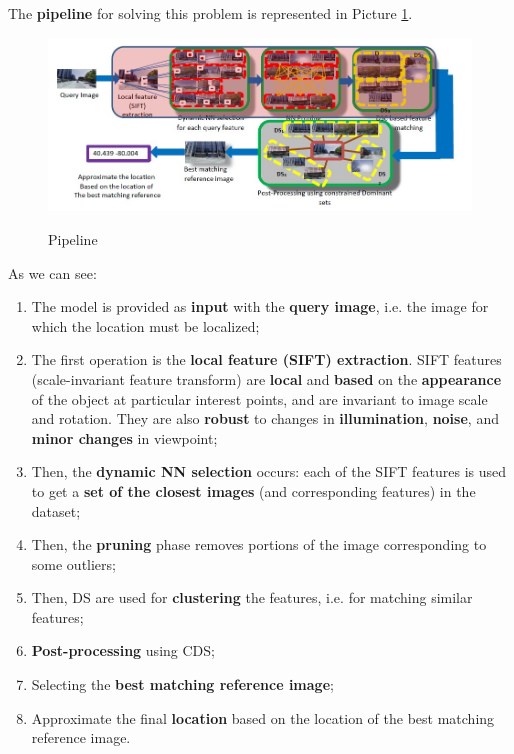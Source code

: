 The \textbf{pipeline} for solving this problem is represented in Picture \ref{geo3}.

\begin{figure}[h!]
    \centering
    \includegraphics[scale = 1.5]{img/geo3.jpg}
    \label{geo3}
    \caption{Pipeline}
\end{figure}

As we can see:

\begin{enumerate}
    \item The model is provided as \textbf{input} with the \textbf{query image}, i.e. the image for which the location must be localized;
    \item The first operation is the \textbf{local feature (SIFT) extraction}. SIFT features (scale-invariant feature transform) are \textbf{local} and \textbf{based} on the \textbf{appearance} of the object at particular interest points, and are invariant to image scale and rotation. They are also \textbf{robust} to changes in \textbf{illumination}, \textbf{noise}, and \textbf{minor changes} in viewpoint;
    \item Then, the \textbf{dynamic NN selection} occurs: each of the SIFT features is used to get a \textbf{set of the closest images} (and corresponding features) in the dataset;
    \item Then, the \textbf{pruning} phase removes portions of the image corresponding to some outliers;
    \item Then, DS are used for \textbf{clustering} the features, i.e. for matching similar features;
    \item \textbf{Post-processing} using CDS;
    \item Selecting the \textbf{best matching reference image};
    \item Approximate the final \textbf{location} based on the location of the best matching reference image.
\end{enumerate}

